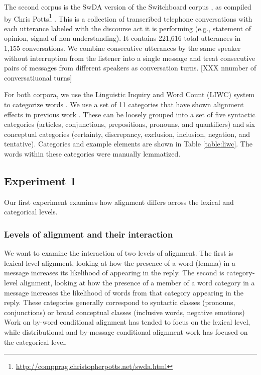 \documentclass[11pt]{article}
\begin{document}
The second corpus is the SwDA version of the Switchboard corpus \cite{JurafskyShribergBiasca1997}, as compiled by Chris Potts\footnote{\url{http://compprag.christopherpotts.net/swda.html}} . This is a collection of transcribed telephone conversations with each utterance labeled with the discourse act it is performing (e.g., statement of opinion, signal of non-understanding).  It contains 221,616 total utterances in 1,155 conversations.  We combine consecutive utterances by the same speaker without interruption from the listener into a single message and treat consecutive pairs of messages from different speakers as conversation turns. [XXX nnumber of conversatiuonal turns]

For both corpora, we use the Linguistic Inquiry and Word Count (LIWC) system to categorize words \cite{LIWC}.  We use a set of 11 categories that have shown alignment effects in previous work \cite{DNMGamonDumais2011}. These can be loosely grouped into a set of five syntactic categories (articles, conjunctions, prepositions, pronouns, and quantifiers) and six conceptual categories (certainty, discrepancy, exclusion, inclusion, negation, and tentative). Categories and example elements are shown in Table \ref{table:liwc}.  The words within these categories were manually lemmatized.

\subsection{Experiment 1}

Our first experiment examines how alignment differs across the lexical and categorical levels.

\subsubsection{Levels of alignment and their interaction}

We want to examine the interaction of two levels of alignment. The first is lexical-level alignment, looking at how the presence of a word (lemma) in a message increases its likelihood of appearing in the reply.  The second is category-level alignment, looking at how the presence of a member of a word category in a message increases the likelihood of words from that category appearing in the reply.  These categories generally correspond to syntactic classes (pronouns, conjunctions) or broad conceptual classes (inclusive words, negative emotions)   Work on by-word conditional alignment has tended to focus on the lexical level, while distributional and by-message conditional alignment work has focused on the categorical level.
\end{document}
